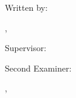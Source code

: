 \begin{titlepage}
  \centering
  {\scshape\paperinstitution\par}
  \vspace{1cm}
  {\scshape\Large\papertype\par}
  \vspace{1.5cm}
  {\huge\bfseries\papertitle\par}
  \vspace{.5cm}
  {\LARGE\bfseries\papersubtitle\par}
  \vspace{2cm}
  {\Large Written by:\par\paperauthor, \paperauthorclass}
  \vfill
  Supervisor:\par
  {\sc\papersupervisor\par}
  \vspace{.5cm}
  Second Examiner:\par
  {\sc\papercoreferent\par}
  \vspace{1cm}
  {\large\paperdate, \paperplace\par}
\end{titlepage}
